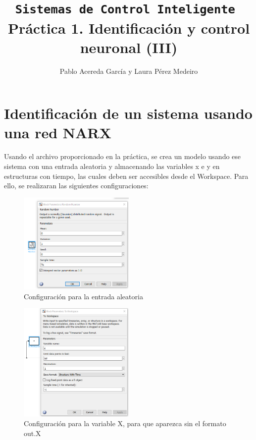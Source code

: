 \documentclass{article}
\title{\texttt{Sistemas de Control Inteligente \newline} Práctica 1. Identificación y control neuronal (III)}
\author{Pablo Acereda García y Laura Pérez Medeiro}
\begin{document}
\maketitle

\section*{Identificación de un sistema usando una red NARX}

Usando el archivo proporcionado en la práctica, se crea un modelo usando ese sistema con una entrada aleatoria y almacenando las variables x e y en estructuras con tiempo, las cuales deben ser accesibles desde el Workspace. Para ello, se realizaran las siguientes configuraciones:


\begin{figure}[h]
\caption{Configuración para la entrada aleatoria}
\centering
\includegraphics[width=0.5\textwidth]{imagenes/randomNumConf.png}
\end{figure}

\begin{figure}[h]
\caption{Configuración para la variable X, para que aparezca sin el formato out.X}
\centering
\includegraphics[width=0.5\textwidth]{imagenes/VarX.png}
\end{figure}
\end{document}
